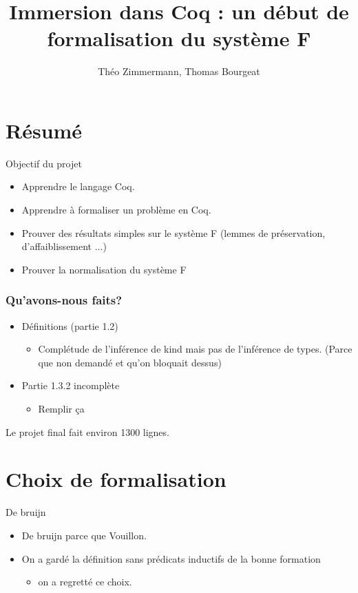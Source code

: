 \documentclass{beamer}
\begin{document}
	\title{Immersion dans Coq : un début de formalisation du système F}
	\author{Théo Zimmermann, Thomas Bourgeat}
\frame{\titlepage}

\section{Résumé}

\begin{frame}
Objectif du projet
\begin{itemize}
\item Apprendre le langage Coq.
\pause
\item Apprendre à formaliser un problème en Coq.
\pause
\item {\scriptsize Prouver des résultats simples sur le système F (lemmes de
préservation, d'affaiblissement ...)}
\item {\tiny Prouver la normalisation du système F}
\end{itemize}


\end{frame}

    \begin{frame}
    \frametitle{Qu'avons-nous faits?}
	\begin{itemize}
	\item Définitions (partie 1.2)
	\begin{itemize}
	\item Complétude de l'inférence de kind mais pas de l'inférence
	de types. (Parce que non demandé et qu'on bloquait dessus)
	\end{itemize}
	\pause
	\item Partie 1.3.2 incomplète
	\begin{itemize}
	\item Remplir ça
	\end{itemize}
	\end{itemize}
	Le projet final fait environ 1300 lignes.
    \end{frame}
     
		
\section{Choix de formalisation}


\begin{frame}{De bruijn}
\begin{itemize}
\item De bruijn parce que Vouillon.
\pause
\item On a gardé la définition sans prédicats inductifs de la bonne
formation
\pause
\begin{itemize}
\item on a regretté ce choix.
\end{itemize}
\end{itemize}
\end{frame}
\end{document}
